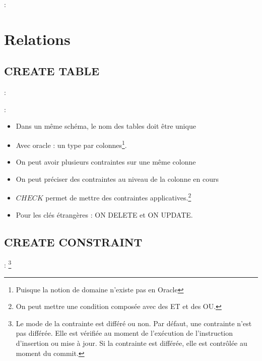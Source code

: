 \documentclass[10pt]{beamer}
\begin{document}
\begin{frame}{\secname : \subsecname}
    
\end{frame}

\section{Relations}
\tocss
\subsection{CREATE TABLE}
\begin{frame}{\secname : \subsecname}
    
\end{frame}

\begin{frame}{\secname : \subsecname}
    \begin{itemize}
        \item Dans un même schéma, le nom des tables doit être unique
        \item Avec oracle : un type par colonnes\footnote{Puisque la notion de domaine n'existe pas en Oracle}.
        \item On peut avoir plusieurs contraintes sur une même colonne
        \item On peut préciser des contraintes au niveau de la colonne en cours
        \item $CHECK$ permet de mettre des contraintes applicatives.\footnote{On peut mettre une condition composée avec des ET et des OU.}
        \item Pour les clés étrangères :  ON DELETE et ON UPDATE.
    \end{itemize}
\end{frame}

\subsection{CREATE CONSTRAINT}
\begin{frame}{\secname : \subsecname}
    \footnote{Le mode de la contrainte est différé ou non.  Par défaut, une contrainte n'est pas différée.  Elle est vérifiée au moment de l'exécution de l'instruction d'insertion ou mise à jour.  Si la contrainte est différée, elle est contrôlée au moment du commit.
    }
\end{frame}
\end{document}
